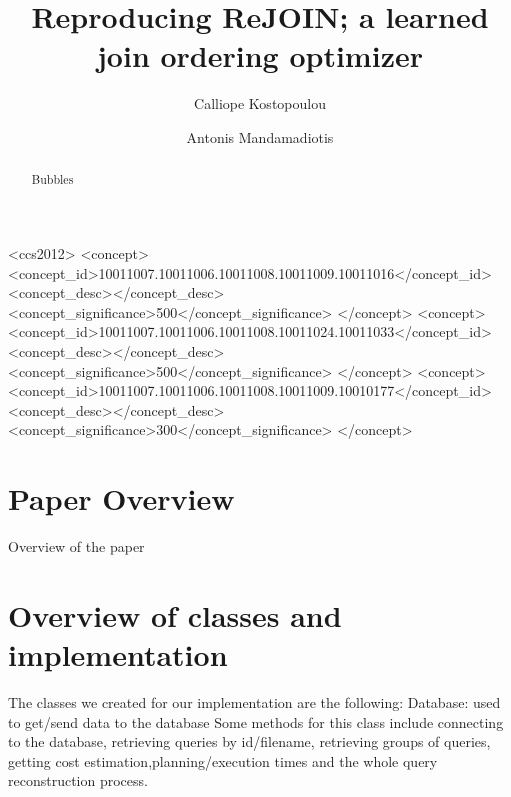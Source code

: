 \documentclass[sigconf,10pt,preprint]{acmart}
\begin{document}
\title{Reproducing ReJOIN;
a learned join ordering optimizer}

\author{Calliope Kostopoulou}
\author{Antonis Mandamadiotis}

\renewcommand{\shortauthors}{C.Kostopoulou, A.Mandamadiotis }
\renewcommand{\shorttitle}{ReJoin}

\begin{abstract}
Bubbles
\end{abstract}

\begin{CCSXML}
  <ccs2012>
    <concept>
      <concept_id>10011007.10011006.10011008.10011009.10011016</concept_id>
      <concept_desc></concept_desc>
      <concept_significance>500</concept_significance>
    </concept>
    <concept>
      <concept_id>10011007.10011006.10011008.10011024.10011033</concept_id>
      <concept_desc></concept_desc>
      <concept_significance>500</concept_significance>
    </concept>
    <concept>
      <concept_id>10011007.10011006.10011008.10011009.10010177</concept_id>
      <concept_desc></concept_desc>
      <concept_significance>300</concept_significance>
    </concept>
\end{CCSXML}



\maketitle

\section{Paper Overview}
\label{paper-overview}

Overview of the paper

\section{Overview of classes and implementation}
\label{implementation-overview}
The classes we created for our implementation are the following:
Database: used to get/send data to the database
Some methods for this class include connecting to the database, retrieving queries by id/filename, retrieving groups of queries, getting cost estimation,planning/execution times and the whole query reconstruction process.
\end{document}
